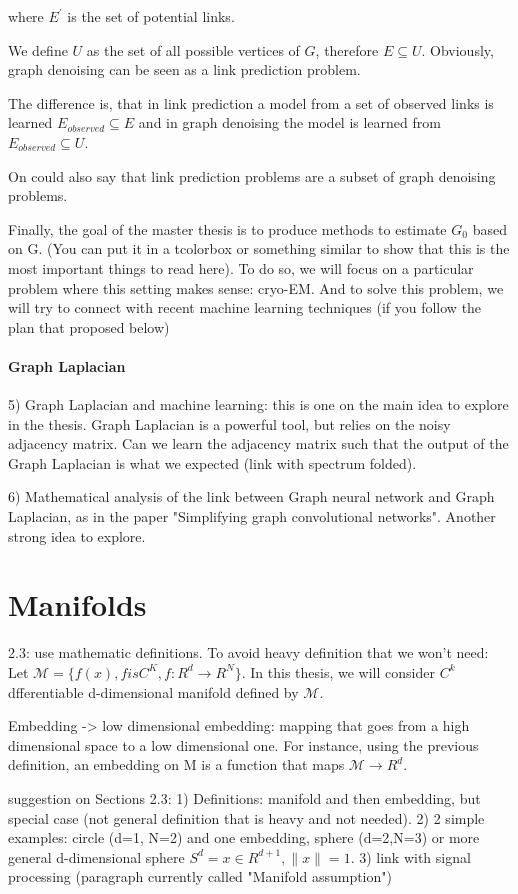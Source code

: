 where $E^{\prime}$ is the set of potential links.

We define $U$ as the set of all possible vertices of $G$, therefore $E \subseteq U$.
Obviously, graph denoising can be seen as a link prediction problem.

The difference is, that in link prediction a model from a set of observed links is learned
$E_{observed} \subseteq E$ and in graph denoising the model is learned from 
$E_{observed} \subseteq U$. 

On could also say that link prediction problems are a subset of graph denoising problems.


\begin{tcolorbox}[colback=red!5!white,colframe=red!75!black]
    Finally, the goal of the master thesis is to produce methods to estimate 
    $G_0$ based on G. 
    (You can put it in a tcolorbox or something similar to show that this is the most important things to read here). 
    To do so, we will focus on a particular problem where this setting makes sense: cryo-EM. And to solve this problem, we will try to connect with recent machine learning techniques
    (if you follow the plan that proposed below)
\end{tcolorbox}

\paragraph{Graph Laplacian}

\begin{tcolorbox}[colback=red!5!white,colframe=red!75!black]
    5) Graph Laplacian and machine learning: this is one on the main idea to explore in the thesis. 
Graph Laplacian is a powerful tool, but relies on the noisy adjacency matrix. 
Can we learn the adjacency matrix such that the output of the Graph Laplacian is what we expected (link with spectrum folded).

6) Mathematical analysis of the link between Graph neural network and Graph Laplacian, as in the paper "Simplifying graph convolutional networks". 
Another strong idea to explore.
\end{tcolorbox}

\section{Manifolds}
2.3: use mathematic definitions.
To avoid heavy definition that we won't need: 
Let $\mathcal{M} = \{ f(x), f is C^K, f: R^d \to R^N \}$. 
In this thesis, we will consider $C^k$ dfferentiable d-dimensional manifold defined by $\mathcal{M}$.

Embedding -> low dimensional embedding: mapping that goes from a high dimensional space to a low dimensional one. 
For instance, using the previous definition, an embedding on M is a function that maps $\mathcal{M} \to R^d$.


suggestion on Sections 2.3:
1) Definitions: manifold and then embedding, but special case (not general definition that is heavy and not needed).
2) 2 simple examples: circle (d=1, N=2) and one embedding, sphere (d=2,N=3) or more general d-dimensional sphere 
$S^d = {x \in R^{d+1}, \|x\|=1}$. 
3) link with signal processing (paragraph currently called "Manifold assumption")